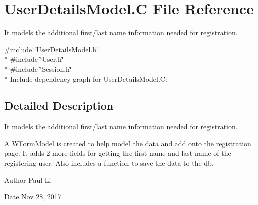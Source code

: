 \hypertarget{UserDetailsModel_8C}{}\section{User\+Details\+Model.\+C File Reference}
\label{UserDetailsModel_8C}


It models the additional first/last name information needed for registration.  


{\ttfamily \#include \char`\"{}User\+Details\+Model.\+h\char`\"{}}\\*
{\ttfamily \#include \char`\"{}User.\+h\char`\"{}}\\*
{\ttfamily \#include \char`\"{}Session.\+h\char`\"{}}\\*
Include dependency graph for User\+Details\+Model.\+C\+:


\subsection{Detailed Description}
It models the additional first/last name information needed for registration. 

A W\+Form\+Model is created to help model the data and add onto the registration page. It adds 2 more fields for getting the first name and last name of the registering user. Also includes a function to save the data to the db.

\begin{DoxyAuthor}{Author}
Paul Li 
\end{DoxyAuthor}
\begin{DoxyDate}{Date}
Nov 28, 2017 
\end{DoxyDate}
